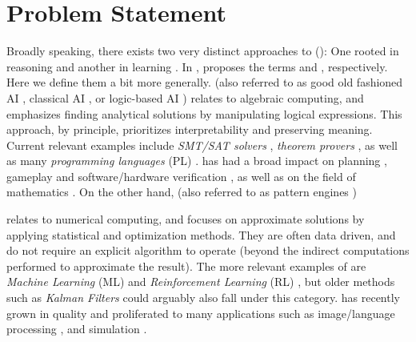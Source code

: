 \chapter{Problem Statement} \label{Chapter:Problem Statement}



Broadly speaking, there exists  two very distinct approaches to \emph{\AILong{}}  (\emph{\AI{}}): One rooted in reasoning and another in learning \mcita{}.  In , \citeauthor{Platzer_2024} proposes the terms \emph{\SiAI{}} and \emph{\SuAI{}}, respectively. Here we define them a bit more generally. \SiAI{} (also referred to as good old fashioned AI \mcita{}, classical AI \mcita{},  or logic-based AI \mcita{}) relates to algebraic computing, and emphasizes finding analytical solutions by manipulating logical expressions. This approach, by principle, prioritizes interpretability and preserving meaning. Current relevant examples include \emph{SMT/SAT solvers} \mcita{}, \emph{theorem provers} \mcita{},  as well as many \emph{programming languages} (PL) \mcita{}.   \SiAI{} has had a broad impact on planning \mcita{}, gameplay \mcita{} and software/hardware verification \mcita{}, as well as on the field of mathematics \mcita{}.  On the other hand, \SuAI{} (also referred to as pattern engines \mcita{})


relates to numerical computing,  and focuses on approximate solutions by applying statistical and optimization methods. They are often data driven, and do not require an explicit algorithm to operate (beyond the indirect computations performed to approximate the result). The more relevant examples of \SuAI{} are \emph{Machine Learning} (ML) \mcita{} and \emph{Reinforcement Learning} (RL) \mcita{}, but older methods such as \emph{Kalman Filters} \mcita{} could arguably also fall under this category.  \SuAI{} has recently grown in quality and proliferated to many applications such as image/language processing \mcita{}, and simulation \mcita{}. 

